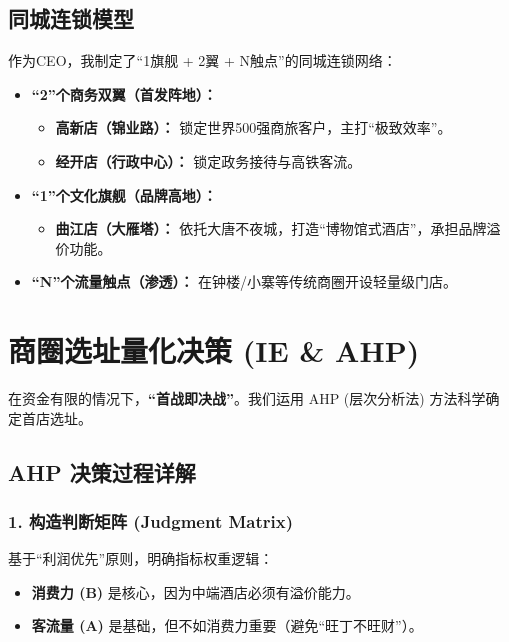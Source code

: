 \documentclass{cumcmthesis}
\begin{document}
\subsection{同城连锁模型}
作为CEO，我制定了“1旗舰 + 2翼 + N触点”的同城连锁网络：
\begin{itemize}
    \item \textbf{“2”个商务双翼（首发阵地）：} 
        \begin{itemize}
            \item \textbf{高新店（锦业路）：} 锁定世界500强商旅客户，主打“极致效率”。
            \item \textbf{经开店（行政中心）：} 锁定政务接待与高铁客流。
        \end{itemize}
    \item \textbf{“1”个文化旗舰（品牌高地）：} 
        \begin{itemize}
            \item \textbf{曲江店（大雁塔）：} 依托大唐不夜城，打造“博物馆式酒店”，承担品牌溢价功能。
        \end{itemize}
    \item \textbf{“N”个流量触点（渗透）：} 在钟楼/小寨等传统商圈开设轻量级门店。
\end{itemize}

\section{商圈选址量化决策 (IE \& AHP)}

在资金有限的情况下，\textbf{“首战即决战”}。我们运用 AHP (层次分析法) 方法科学确定首店选址。

\subsection{AHP 决策过程详解}

\subsubsection{1. 构造判断矩阵 (Judgment Matrix)}
基于“利润优先”原则，明确指标权重逻辑：
\begin{itemize}
    \item \textbf{消费力 (B)} 是核心，因为中端酒店必须有溢价能力。
    \item \textbf{客流量 (A)} 是基础，但不如消费力重要（避免“旺丁不旺财”）。
\end{itemize}
\end{document}
